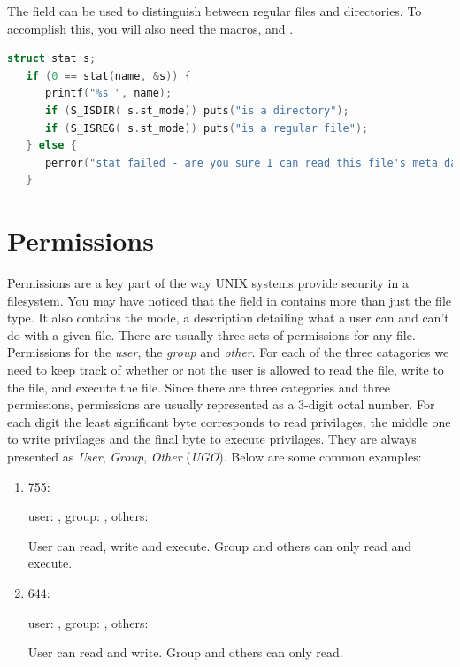 The  field can be used to distinguish between regular files and directories. To accomplish this, you will also need the macros,  and .

\begin{lstlisting}[language=C]
   struct stat s;
   if (0 == stat(name, &s)) {
      printf("%s ", name);
      if (S_ISDIR( s.st_mode)) puts("is a directory");
      if (S_ISREG( s.st_mode)) puts("is a regular file");
   } else {
      perror("stat failed - are you sure I can read this file's meta data?");
   }
\end{lstlisting}

\section{Permissions}

Permissions are a key part of the way UNIX systems provide security in a filesystem. You may have noticed that the  field in  contains more than just the file type. It also contains the mode, a description detailing what a user can and can't do with a given file. There are usually three sets of permissions for any file. Permissions for the \emph{user}, the \emph{group} and \emph{other}. For each of the three catagories we need to keep track of whether or not the user is allowed to read the file, write to the file, and execute the file. Since there are three categories and three permissions, permissions are usually represented as a 3-digit octal number. For each digit the least significant byte corresponds to read privilages, the middle one to write privilages and the final byte to execute privilages. They are always presented as \emph{User}, \emph{Group}, \emph{Other} (\emph{UGO}). Below are some common examples:

\begin{enumerate}

\item 755: 

user: , group: , others: 

User can read, write and execute. Group and others can only read and execute.

\item 644: 

user: , group: , others: 

User can read and write. Group and others can only read.

\end{enumerate}

